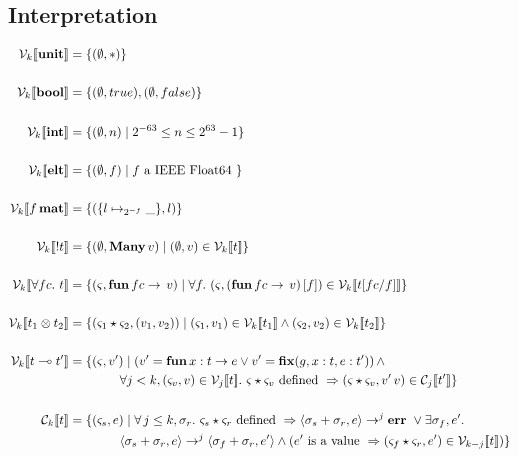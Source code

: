 \subsection{Interpretation}

\begin{align*}
  \V{k}{ \Unit } &= \{ (\empH, \ast) \} \\
\\
    \V{k}{ \Bool } &= \{ (\empH, true), (\empH, false) \} \\
\\
    \V{k}{ \Int } &= \{ (\empH, n) \mid 2^{-63} \leq n \leq 2^{63} -1 \} \\
\\
    \V{k}{ \Elt } &= \{ (\empH, f) \mid f \textrm{ a IEEE Float64 } \} \\
\\
    \V{k}{ f \, \Mat } &= \{ (\{ l \mapsto_{2^{-f}} \_ \} , l) \} \\
\\
    \V{k}{ \Bang t } &= \{ (\empH, \Many\, v) \mid (\empH, v) \in \V{k}{t} \} \\
\\
    \V{k}{ \forall fc.\  t } &= \{ (\varsigma, \ottkw{fun}\, fc \rightarrow \, v) \mid \forall f.\ (\varsigma, (\ottkw{fun}\, fc \rightarrow \, v)\, [ f ]) \in \V{k}{ t [ fc / f ] } \} \\
\\
    \V{k}{ t_1 \otimes t_2 } &= \{ (\varsigma_1 \star \varsigma_2, ( v_1, v_2 )) \mid (\varsigma_1, v_1) \in \V{k}{t_1} \wedge (\varsigma_2, v_2) \in \V{k}{t_2} \} \\
\\
    \V{k}{ t \multimap t' } &= \{ (\varsigma, v' ) \mid ( v' = \ottkw{fun}\, x : t \rightarrow e \vee v' = \ottkw{fix} (g, x : t, e : t') ) \, \wedge\\
                            & \qquad \qquad \forall j < k, (\varsigma_v, v) \in \V{j}{ t }.\ \varsigma \star \varsigma_v \textrm{ defined } \Rightarrow (\varsigma \star \varsigma_v, v'\, v) \in \C{j}{ t' } \} \\
\\
    \C{k}{ t } &= \{ (\varsigma_s, e) \mid \forall \, j \leq k, \sigma_r.\ \varsigma_s \star \varsigma_r \textrm{ defined } \Rightarrow \langle \sigma_s + \sigma_r, e \rangle \rightarrow^j \ottkw{err}\ \vee \exists \sigma_f, e'.\\
               & \qquad \qquad \langle \sigma_s + \sigma_r, e \rangle \rightarrow^j \langle \sigma_f + \sigma_r, e' \rangle \wedge ( e' \textrm { is a value } \Rightarrow ( \varsigma_f \star \varsigma_r, e' ) \in \V{k-j}{t} ) \} \\

\end{align*}
